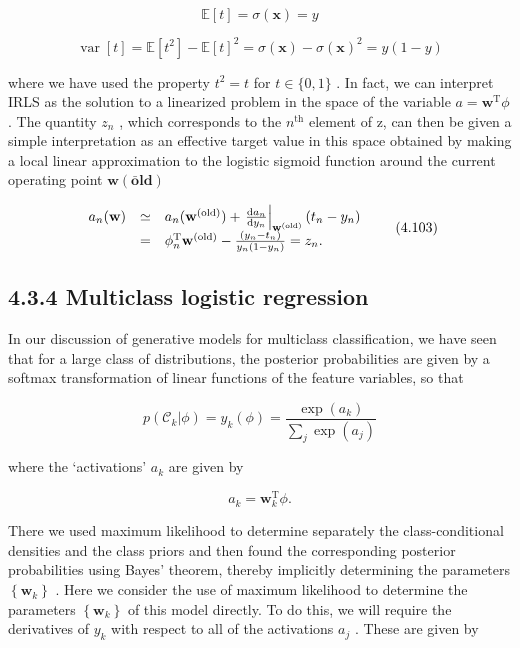 \documentclass[
  10
]{article}
\begin{document}
\[
{\mathbb {E} [ t ]} = {\sigma (\mathbf {x}) = y}\tag{4.101}
\]

\[
\operatorname{var} [ t ] = \mathbb {E} [ t ^ {2} ] - \mathbb {E} [ t ] ^ {2} = \sigma (\mathbf {x}) - \sigma (\mathbf {x}) ^ {2} = y (1 - y)\tag{4.102}
\]

where we have used the property \(t ^ { 2 } = t\) for
\(t \in \{ 0 , 1 \}\) . In fact, we can interpret IRLS as the solution
to a linearized problem in the space of the variable
\(a = \mathbf { w } ^ { \mathrm { T } } \phi\) . The quantity
\(z _ { n }\) , which corresponds to the \(n ^ { \mathrm { t h } }\)
element of z, can then be given a simple interpretation as an effective
target value in this space obtained by making a local linear
approximation to the logistic sigmoid function around the current
operating point \(\mathbf { w } \mathbf { ( \bar { o } l d ) }\)

\[
\begin{array}{r c l} {a _ {n} (\mathbf {w})} & \simeq & {a _ {n} (\mathbf {w} ^ {(\mathrm{old})}) + \left. \frac {\mathrm{d} a _ {n}}{\mathrm{d} y _ {n}} \right| _ {\mathbf {w} ^ {(\mathrm{old})}} (t _ {n} - y _ {n})} \\ & = & {\phi_ {n} ^ {\mathrm{T}} \mathbf {w} ^ {(\mathrm{old})} - \frac {(y _ {n} - t _ {n})}{y _ {n} (1 - y _ {n})} = z _ {n}.} \end{array}\tag{4.103}
\]

\subsection{4.3.4 Multiclass logistic
regression}\label{multiclass-logistic-regression}

In our discussion of generative models for multiclass classification, we
have seen that for a large class of distributions, the posterior
probabilities are given by a softmax transformation of linear functions
of the feature variables, so that

\[
p (\mathcal {C} _ {k} | \phi) = y _ {k} (\phi) = \frac {\exp (a _ {k})}{\sum_ {j} \exp (a _ {j})}\tag{4.104}
\]

where the `activations' \(a _ { k }\) are given by

\[
a _ {k} = \mathbf {w} _ {k} ^ {\mathrm{T}} \phi .\tag{4.105}
\]

There we used maximum likelihood to determine separately the
class-conditional densities and the class priors and then found the
corresponding posterior probabilities using Bayes' theorem, thereby
implicitly determining the parameters
\(\left\{ \mathbf { w } _ { k } \right\}\) . Here we consider the use of
maximum likelihood to determine the parameters
\(\left\{ \mathbf { w } _ { k } \right\}\) of this model directly. To do
this, we will require the derivatives of \(y _ { k }\) with respect to
all of the activations \(a _ { j }\) . These are given by
\end{document}
